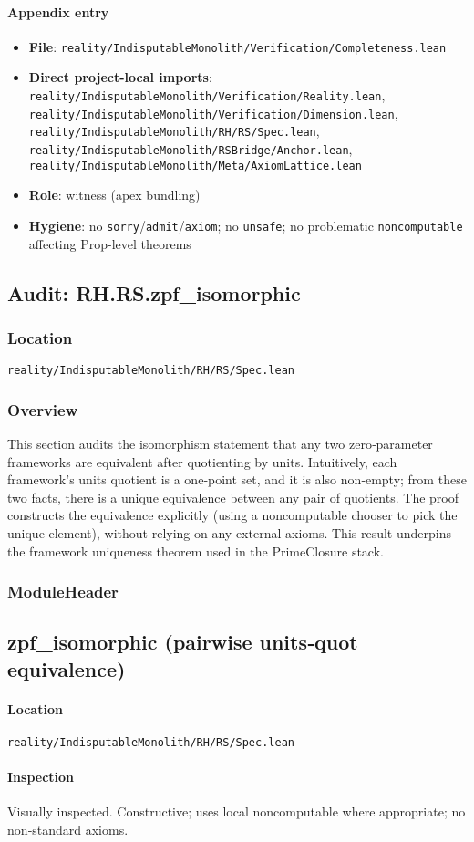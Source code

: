 \documentclass{article}
\newcommand{\FileRef}[1]{\texttt{#1}}
\newcommand{\ModuleHeader}[3]{%
  \subsection{#1}
  \paragraph{Location} \FileRef{#2}\\
  \paragraph{Inspection} #3
}
\begin{document}
\paragraph{Appendix entry}
\begin{itemize}[leftmargin=*]
  \item \textbf{File}: \FileRef{reality/IndisputableMonolith/Verification/Completeness.lean}
  \item \textbf{Direct project-local imports}: \FileRef{reality/IndisputableMonolith/Verification/Reality.lean}, \FileRef{reality/IndisputableMonolith/Verification/Dimension.lean}, \FileRef{reality/IndisputableMonolith/RH/RS/Spec.lean}, \FileRef{reality/IndisputableMonolith/RSBridge/Anchor.lean}, \FileRef{reality/IndisputableMonolith/Meta/AxiomLattice.lean}
  \item \textbf{Role}: witness (apex bundling)
  \item \textbf{Hygiene}: no \texttt{sorry}/\texttt{admit}/\texttt{axiom}; no \texttt{unsafe}; no problematic \texttt{noncomputable} affecting Prop-level theorems
\end{itemize}

\subsection{Audit: RH.RS.zpf\_isomorphic}
\subsubsection{Location}
\FileRef{reality/IndisputableMonolith/RH/RS/Spec.lean}

\subsubsection{Overview}
This section audits the isomorphism statement that any two zero‑parameter frameworks are equivalent after quotienting by units. Intuitively, each framework's units quotient is a one‑point set, and it is also non‑empty; from these two facts, there is a unique equivalence between any pair of quotients. The proof constructs the equivalence explicitly (using a noncomputable chooser to pick the unique element), without relying on any external axioms. This result underpins the framework uniqueness theorem used in the PrimeClosure stack.

\subsubsection{ModuleHeader}
\ModuleHeader{zpf\_isomorphic (pairwise units‑quot equivalence)}{reality/IndisputableMonolith/RH/RS/Spec.lean}{Visually inspected. Constructive; uses local noncomputable where appropriate; no non‑standard axioms.}
\end{document}

